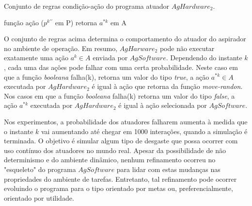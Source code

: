 \begin{algorithm}[h!]
    \caption{\label{alg:exp2-behaviour} Conjunto de regras condição-ação do programa atuador $AgHardware_2$.}
    função ação ($p^{k\prime\prime}$ em P) retorna $a^{*k}$ em A\\
\end{algorithm}

O conjunto de regras acima determina o comportamento do atuador do aspirador no ambiente de operação. Em resumo, $AgHarware_2$ pode não executar exatamente uma ação $a^k \in A$ enviada por $AgSoftware$. Dependendo do instante $k$, cada uma das ações pode falhar com uma certa probabilidade. Neste caso em que a função \textit{booleana} falha(k), retorna um valor do tipo \textit{true}, a ação $a^{*k} \in A$ executada por $AgHardware_2$ é igual à ação que retorna da função \textit{move-randon}. Nos casos em que a função \textit{booleana} falha(k) retorna um valor do tipo \textit{false}, a ação $a^{*k}$ executada por $AgHardware_2$ é igual à ação selecionada por $AgSoftware$.

Nos experimentos, a probabilidade dos atuadores falharem aumenta à medida que o instante $k$ vai aumentando até chegar em 1000 interações, quando a simulação é terminada. O objetivo é simular algum tipo de desgaste que possa ocorrer com uso contínuo dos atuadores no mundo real. Apesar da possibilidade de não determinismo e do ambiente dinâmico, nenhum refinamento ocorreu no "esqueleto" do programa $AgSoftware$ para lidar com estas mudanças nas propriedades do ambiente de tarefas. Entretanto, tal refinamento pode ocorrer evoluindo o programa para o tipo orientado por metas ou, preferencialmente, orientado por utilidade. 

